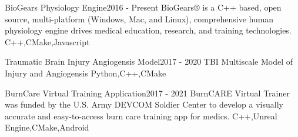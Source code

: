 %
%
%


\begin{projects}
	\project
	{BioGears Physiology Engine}{2016 - Present}
	{} 
	{BioGears® is a C++ based, open source, multi-platform (Windows, Mac, and Linux), comprehensive human physiology engine drives medical education, research, and training technologies.}  
	{C++,CMake,Javascript}
				
	\project
	{Traumatic Brain Injury Angiogensis Model}{2017 - 2020}
	{} 
	{TBI Multiscale Model of Injury and Angiogensis}
	{Python,C++,CMake}

	\project
	{BurnCare Virtual Training Application}{2017 - 2021}
	{} 
	{BurnCARE Virtual Trainer was funded by the U.S. Army DEVCOM Soldier Center to develop a visually accurate and easy-to-access burn care training app for medics.}
	{C++,Unreal Engine,CMake,Android}

\end{projects}

